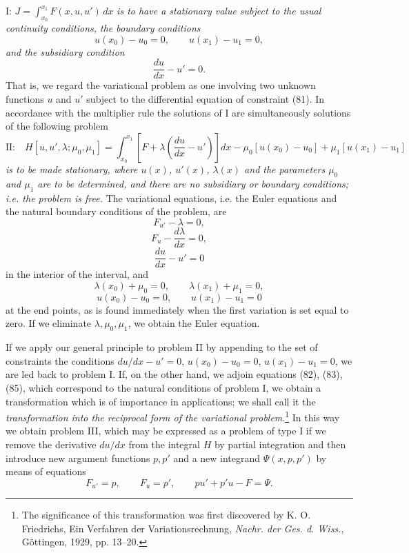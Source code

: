 I: $J=\int_{x_0}^{x_1}F(x,u,u')\,dx$ \emph{is to have a stationary value subject to the usual continuity conditions, the boundary conditions}
\begin{equation}\tag{80}
u(x_0)-u_0=0,\qquad u(x_1)-u_1=0,
\end{equation}
\emph{and the subsidiary condition}
\begin{equation}\tag{81}
\frac{du}{dx}-u'=0.
\end{equation}
That is, we regard the variational problem as one involving two unknown functions $u$ and $u'$ subject to the differential equation of constraint (81). In accordance with the multiplier rule the solutions of I are simultaneously solutions of the following problem
\[
\text{II:}\quad H[u,u',\lambda;\mu_0,\mu_1]
=\int_{x_0}^{x_1}\left[F+\lambda\left(\frac{du}{dx}-u'\right)\right]dx
-\mu_0[u(x_0)-u_0]+\mu_1[u(x_1)-u_1]
\]
\emph{is to be made stationary, where $u(x)$, $u'(x)$, $\lambda(x)$ and the parameters $\mu_0$ and $\mu_1$ are to be determined, and there are no subsidiary or boundary conditions; i.e. the problem is free.} The variational equations, i.e. the Euler equations and the natural boundary conditions of the problem, are
\begin{equation}\tag{82}
F_{u'}-\lambda=0,
\end{equation}
\begin{equation}\tag{83}
F_u-\frac{d\lambda}{dx}=0,
\end{equation}
\begin{equation}\tag{84}
\frac{du}{dx}-u'=0
\end{equation}
in the interior of the interval, and
\begin{equation}\tag{85}
\lambda(x_0)+\mu_0=0,\qquad \lambda(x_1)+\mu_1=0,
\end{equation}
\begin{equation}\tag{86}
u(x_0)-u_0=0,\qquad u(x_1)-u_1=0
\end{equation}
at the end points, as is found immediately when the first variation is set equal to zero. If we eliminate $\lambda,\mu_0,\mu_1$, we obtain the Euler equation.

If we apply our general principle to problem II by appending to the set of constraints the conditions $du/dx-u'=0$, $u(x_0)-u_0=0$, $u(x_1)-u_1=0$, we are led back to problem I. If, on the other hand, we adjoin equations (82), (83), (85), which correspond to the natural conditions of problem I, we obtain a transformation which is of importance in applications; we shall call it the \emph{transformation into the reciprocal form of the variational problem}.\footnote{The significance of this transformation was first discovered by K. O. Friedrichs, Ein Verfahren der Variationsrechnung, \emph{Nachr. der Ges. d. Wiss.}, G\"ottingen, 1929, pp. 13--20.} In this way we obtain problem III, which may be expressed as a problem of type I if we remove the derivative $du/dx$ from the integral $H$ by partial integration and then introduce new argument functions $p,p'$ and a new integrand $\Psi(x,p,p')$ by means of equations
\begin{equation}\tag{87}
F_{u'}=p,\qquad F_u=p',\qquad pu'+p'u-F=\Psi.
\end{equation}


